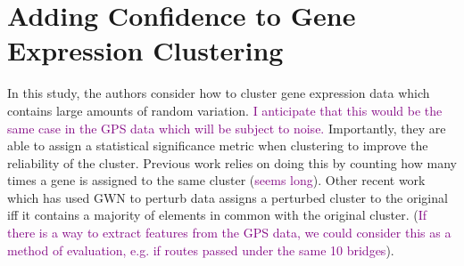 \documentclass{article}
\newcommand\NOTE[1]{\textcolor{purple}{#1}}
\begin{document}
    \section{Adding Confidence to Gene Expression Clustering}

    In this study, the authors consider how to cluster gene expression data which contains large amounts of random variation. \NOTE{I anticipate that this would be the same case in the GPS data which will be subject to noise.} Importantly, they are able to assign a statistical significance metric when clustering to improve the reliability of the cluster. Previous work relies on doing this by counting how many times a gene is assigned to the same cluster (\NOTE{seems long}). Other recent work which has used GWN to perturb data assigns a perturbed cluster to the original iff it contains a majority of elements in common with the original cluster. (\NOTE{If there is a way to extract features from the GPS data, we could consider this as a method of evaluation, e.g. if routes passed under the same 10 bridges}). 
\end{document}
